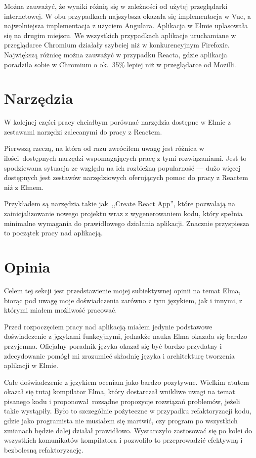 \documentclass[twoside,a4paper]{report}
\begin{document}
Można zauważyć, że wyniki różnią się w zależności od użytej przeglądarki internetowej.
W obu przypadkach najszybsza okazała się implementacja w Vue, a najwolniejsza implementacja z użyciem Angulara.
Aplikacja w Elmie uplasowała się na drugim miejscu.
We wszystkich przypadkach aplikacje uruchamiane w przeglądarce Chromium działały szybciej niż w konkurencyjnym Firefoxie.
Największą różnicę można zauważyć w przypadku Reacta, gdzie aplikacja poradziła sobie w Chromium o ok.~35\% lepiej niż w przeglądarce od Mozilli.

\section{Narzędzia}
W kolejnej części pracy chciałbym porównać narzędzia dostępne w Elmie z zestawami narzędzi zalecanymi do pracy z Reactem.

Pierwszą rzeczą, na która od razu zwróciłem uwagę jest różnica w ilości dostępnych narzędzi wspomagających pracę z tymi rozwiązaniami.
Jest to spodziewana sytuacja ze względu na ich rozbieżną popularność --- dużo więcej dostępnych jest zestawów narzędziowych oferujących pomoc do pracy z Reactem niż z Elmem.

Przykładem są narzędzia takie jak~,,Create React App'', które pozwalają na zainicjalizowanie nowego projektu wraz z wygenerowaniem kodu, który spełnia minimalne wymagania do prawidłowego działania aplikacji.
Znacznie przyspiesza to początek pracy nad aplikacją.



\section{Opinia}
Celem tej sekcji jest przedstawienie mojej subiektywnej opinii na temat Elma, biorąc pod uwagę moje doświadczenia zarówno z tym językiem, jak i innymi, z którymi miałem możliwość pracować.

Przed rozpoczęciem pracy nad aplikacją miałem jedynie podstawowe doświadczenie z językami funkcyjnymi, jednakże nauka Elma okazała się bardzo przyjemna.
Oficjalny poradnik języka okazał się być bardzo przydatny i zdecydowanie pomógł mi zrozumieć składnię języka i architekturę tworzenia aplikacji w Elmie.

Całe doświadczenie z językiem oceniam jako bardzo pozytywne.
Wielkim atutem okazał się tutaj kompilator Elma, który dostarczał wnikliwe uwagi na temat pisanego kodu i proponował rozsądne propozycje rozwiązań problemów, jeżeli takie wystąpiły.
Było to szczególnie pożyteczne w przypadku refaktoryzacji kodu, gdzie jako programista nie musiałem się martwić, czy program po wszystkich zmianach będzie dalej działał prawidłowo.
Wystarczyło zastosować się po kolei do wszystkich komunikatów kompilatora i pozwoliło to przeprowadzić efektywną i bezbolesną refaktoryzację.
\end{document}
